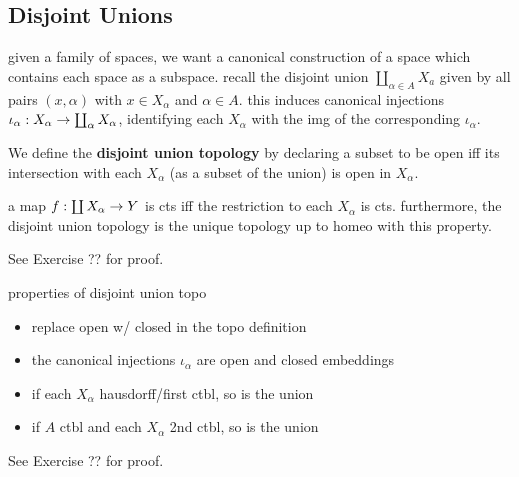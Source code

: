 \subsection{Disjoint Unions}
given a family of spaces, we want a canonical construction of a space which
contains each space as a subspace. recall the disjoint union $ \coprod_{\alpha
\in A}X_{a} $ given by all pairs $ (x, \alpha) $ with $ x \in X_{\alpha} $ and
$ \alpha \in A $. this induces canonical injections $ \iota_{\alpha}:X_{\alpha}
\rightarrow \coprod_{\alpha}X_{\alpha} $, identifying each $ X_{\alpha} $ with the img
of the corresponding $ \iota_{\alpha} $.

\begin{defn}
    We define the \textbf{disjoint union topology} by declaring a subset to be
    open iff its intersection with each $ X_{\alpha} $ (as a subset of the union)
    is open in $ X_{\alpha} $.
\end{defn}

\begin{prop}[type=Theorem,title=Characteristic Property of Disjoint Unions]
    a map $ f:\coprod X_{\alpha}\rightarrow Y $ is cts iff the restriction to each
    $ X_{\alpha} $ is cts. furthermore, the disjoint union topology is the unique
    topology up to homeo with this property.
\end{prop}
See Exercise ?? for proof.

\begin{prop}
    properties of disjoint union topo
    \begin{itemize}
        \item replace open w/ closed in the topo definition
        \item the canonical injections $ \iota_{\alpha} $ are open and closed
            embeddings
        \item if each $ X_{\alpha} $ hausdorff/first ctbl, so is the union
        \item if $ A $ ctbl and each $ X_{\alpha} $ 2nd ctbl, so is the union
    \end{itemize}
\end{prop}
See Exercise ?? for proof.

